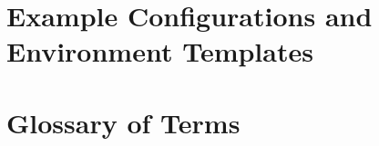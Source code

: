 \documentclass[a4paper,twoside]{sapthesis}
\begin{document}
\chapter{Example Configurations and Environment Templates}
\label{app:example-configs}

\chapter{Glossary of Terms}
\label{app:glossary}
%
%
%



\backmatter

\end{document}
